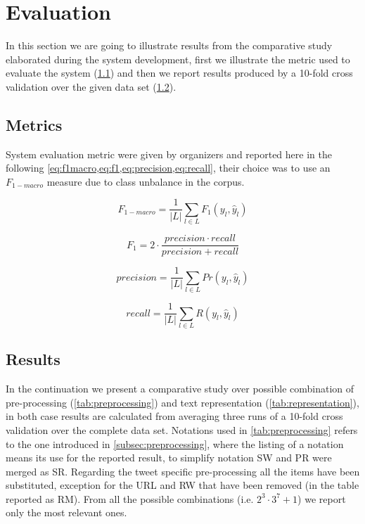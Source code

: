\section{Evaluation} \label{sec:evaluation}

In this section we are going to illustrate results from the comparative study elaborated during the system development, first we illustrate the metric used to evaluate the system (\cref{subsec:metric}) and then we report results produced by a 10-fold cross validation over the given data set (\cref{subsec:results}).

\subsection{Metrics} \label{subsec:metric}

System evaluation metric were given by organizers and reported here in the following \cref{eq:f1macro,eq:f1,eq:precision,eq:recall}, their choice was to use an $F_{1-macro}$ measure due to class unbalance in the corpus.

\begin{multicols}{2}
\begin{equation} \label{eq:f1macro}
F_{1-macro} = \frac{1}{|L|} \displaystyle\sum_{l\in L} F_1(y_l, \hat{y}_l)
\end{equation}

\begin{equation} \label{eq:f1}
F_1 = 2 \cdot \frac{precision \cdot recall }{precision + recall}
\end{equation}

\begin{equation} \label{eq:precision}
precision = \frac{1}{|L|} \displaystyle\sum_{l\in L} Pr(y_l, \hat{y}_l)
\end{equation}

\begin{equation} \label{eq:recall}
recall = \frac{1}{|L|} \displaystyle\sum_{l\in L} R(y_l, \hat{y}_l)
\end{equation}
\end{multicols}



\subsection{Results} \label{subsec:results}

In the continuation we present a comparative study over possible combination of pre-processing (\cref{tab:preprocessing}) and text representation (\cref{tab:representation}), in both case results are calculated from averaging three runs of a 10-fold cross validation over the complete data set.
Notations used in \cref{tab:preprocessing} refers to the one introduced in \cref{subsec:preprocessing}, where the listing of a notation means its use for the reported result, to simplify notation SW and PR were merged as SR.
Regarding the tweet specific pre-processing all the items have been substituted, exception for the URL and RW that have been removed (in the table reported as RM). From all the possible combinations (i.e. $2^3\cdot3^{7}+1$) we report only the most relevant ones.

